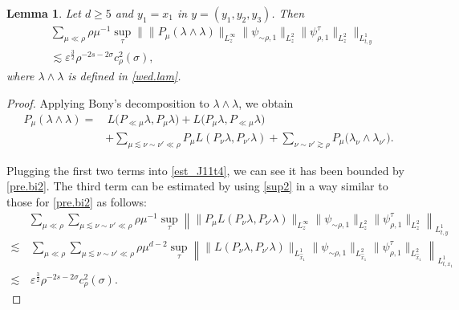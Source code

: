 \documentclass[10pt,a4paper]{amsart}
\newtheorem{lemma}{Lemma}
\begin{document}
 \begin{lemma}  \label{lem_J11t4}
Let \(d\geq5\) and \(y_1=x_1\) in \(y=(y_1,y_2,y_3)\). Then
\begin{align} 
 		& \sum_{\mu \ll \rho}  \rho \mu^{-1} \sup_\tau \big\| \| P_{\mu} \left(\lambda\wedge\lambda\right) \|_{L^\infty_z} \|     \psi_{\sim \rho ,1}\|_{L^2_z}   \|     \psi_{\rho,1}^\tau\|_{L^2_z}     \big\|_{L^1_{t,y}}  \nonumber\\
 &\lesssim  \varepsilon^{\frac32} \rho^{-2s -2\sigma}  c_{\rho }^2 (\sigma),\label{est_J11t4}
 	\end{align}
    where \(\lambda\wedge\lambda\) is defined in \eqref{wed.lam}.
 \end{lemma}

 \begin{proof}
Applying Bony's decomposition to \(\lambda\wedge\lambda\), we obtain
\begin{align}
P_\mu(\lambda\wedge\lambda)
=&\,
L\bigl(P_{\ll\mu}\lambda,P_\mu\lambda\bigr)
+
L\bigl(P_\mu\lambda,P_{\ll\mu}\lambda\bigr)  
\nonumber\\
&+ \sum_{\mu\lesssim \nu\sim\nu'\ll\rho} P_\mu L(P_\nu\lambda,P_{\nu'}\lambda)+
\sum_{\nu\sim\nu'\gtrsim\rho}
P_\mu\bigl(\lambda_\nu\wedge\lambda_{\nu'}\bigr).
\label{gauss.bony}
\end{align}


Plugging the first two terms into \eqref{est_J11t4}, we can see it has been bounded by \eqref{pre.bi2}. The third term can be estimated by using \eqref{sup2} in a way similar  to those for \eqref{pre.bi2} as follows:
\begin{align*}
&\sum_{\mu\ll\rho}
\sum_{\mu\lesssim\nu\sim\nu'\ll\rho}
\rho\mu^{-1}
\sup_\tau
\left\|
\|P_\mu L(P_\nu\lambda,P_{\nu'}\lambda)\|_{L_z^\infty}
\|\psi_{\sim\rho,1}\|_{L_z^2}
\|\psi_{\rho,1}^\tau\|_{L_z^2}
\right\|_{L_{t,y}^1}
\\
\lesssim&\, \sum_{\mu\ll\rho}
\sum_{\mu\lesssim\nu\sim\nu'\ll\rho}
\rho\mu^{d-2}
\sup_\tau
\left\|
\|  L(P_\nu\lambda,P_{\nu'}\lambda)\|_{L_{\widehat{x}_1}^1}
\|\psi_{\sim\rho,1}\|_{L_{\widehat{x}_1}^2}
\|\psi_{\rho,1}^\tau\|_{L_{\widehat{x}_1}^2}
\right\|_{L_{t,x_1}^1}\\
\lesssim &\,
\varepsilon^{\frac32}
\rho^{-2s-2\sigma}
c_\rho^2(\sigma).
\end{align*}


\end{proof}
\end{document}
